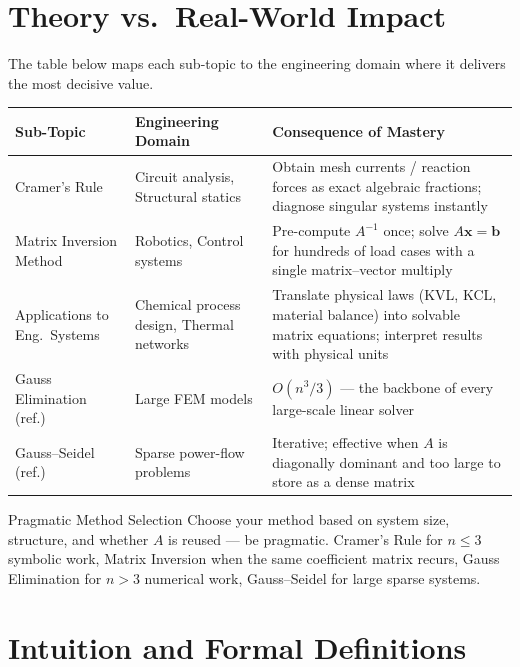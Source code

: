 \documentclass[12pt,a4paper]{article}
\begin{document}
\section{Theory vs.\ Real-World Impact}

The table below maps each sub-topic to the engineering domain where it delivers the most decisive value.

\begin{center}
\begin{tabular}{@{}p{3.2cm} p{3.8cm} p{5.8cm}@{}}
\toprule
\textbf{Sub-Topic} & \textbf{Engineering Domain} & \textbf{Consequence of Mastery} \\
\midrule
Cramer's Rule & Circuit analysis, Structural statics & Obtain mesh currents / reaction forces as exact algebraic fractions; diagnose singular systems instantly \\
\addlinespace
Matrix Inversion Method & Robotics, Control systems & Pre-compute \(A^{-1}\) once; solve \(A\mathbf{x}=\mathbf{b}\) for hundreds of load cases with a single matrix--vector multiply \\
\addlinespace
Applications to Eng.\ Systems & Chemical process design, Thermal networks & Translate physical laws (KVL, KCL, material balance) into solvable matrix equations; interpret results with physical units \\
\addlinespace
Gauss Elimination (ref.) & Large FEM models & \(O(n^{3}/3)\) --- the backbone of every large-scale linear solver \\
\addlinespace
Gauss--Seidel (ref.) & Sparse power-flow problems & Iterative; effective when \(A\) is diagonally dominant and too large to store as a dense matrix \\
\bottomrule
\end{tabular}
\end{center}

\begin{learnbox}{Pragmatic Method Selection}
Choose your method based on system size, structure, and whether \(A\) is reused --- be pragmatic. Cramer's Rule for \(n \leq 3\) symbolic work, Matrix Inversion when the same coefficient matrix recurs, Gauss Elimination for \(n > 3\) numerical work, Gauss--Seidel for large sparse systems.
\end{learnbox}

\section{Intuition and Formal Definitions}
\end{document}
